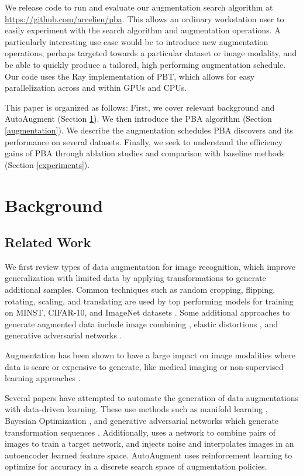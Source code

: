 \documentclass{article}
\begin{document}
We release code to run and evaluate our augmentation search algorithm at \url{https://github.com/arcelien/pba}. This allows an ordinary workstation user to easily experiment with the search algorithm and augmentation operations. A particularly interesting use case would be to introduce new augmentation operations, perhaps targeted towards a particular dataset or image modality, and be able to quickly produce a tailored, high performing augmentation schedule. Our code uses the Ray \cite{ray} implementation of PBT, which allows for easy parallelization across and within GPUs and CPUs.

This paper is organized as follows: First, we cover relevant background and AutoAugment (Section \ref{background}). We then introduce the PBA algorithm (Section \ref{augmentation}). We describe the augmentation schedules PBA discovers and its performance on several datasets. Finally, we seek to understand the efficiency gains of PBA through ablation studies and comparison with baseline methods (Section \ref{experiments}).

\section{Background}
\label{background}

\subsection{Related Work}
\label{related-work} 

We first review types of data augmentation for image recognition, which improve generalization with limited data by applying transformations to generate additional samples. Common techniques such as random cropping, flipping, rotating, scaling, and translating are used by top performing models for training on MINST, CIFAR-10, and ImageNet datasets \cite{aa_2, aa_30, aa_31, aa_32, alexnet, nin, pyramidnet}. Some additional approaches to generate augmented data include image combining \cite{samplepairing, manifold_4}, elastic distortions \cite{manifold_2}, and generative adversarial networks \cite{manifold_6}.

Augmentation has been shown to have a large impact on image modalities where data is scare or expensive to generate, like medical imaging \cite{manifold_8, manifold_9} or non-supervised learning approaches \cite{Mundhenk2018ImprovementsTC}.

Several papers have attempted to automate the generation of data augmentations with data-driven learning. These use methods such as manifold learning \cite{manifold}, Bayesian Optimization \cite{bayesian-data-aug}, and generative adversarial networks which generate transformation sequences \cite{ratner}. Additionally, \cite{smart-aug} uses a network to combine pairs of images to train a target network, and \cite{manifold_3} injects noise and interpolates images in an autoencoder learned feature space. AutoAugment \cite{autoaug} uses reinforcement learning to optimize for accuracy in a discrete search space of augmentation policies.
\end{document}

